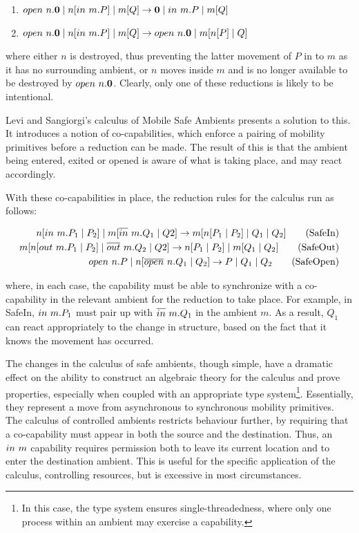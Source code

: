 \begin{enumerate}
\item $open\ n.\textbf{0} \;|\; n[in\ m.P] \;|\; m[Q] \rightarrow \textbf{0} \;|\;
in\ m.P \;|\; m[Q]$
\item $open\ n.\textbf{0} \;|\; n[in\ m.P] \;|\; m[Q] \rightarrow
open\ n.\textbf{0} \;|\; m[n[P] \;|\; Q]$
\end{enumerate}

\noindent where either $n$ is destroyed, thus preventing the latter
movement of $P$ in to $m$ as it has no surrounding ambient, or $n$ moves
inside $m$ and is no longer available to be destroyed by
$open\ n.\textbf{0}$.  Clearly, only one of these reductions is likely to be
intentional.  

Levi and Sangiorgi's calculus of Mobile Safe Ambients
\cite*{safeamb00,sangiorgi:mobsafeambients} presents a solution to
this.  It introduces a notion of co-capabilities, which enforce a
pairing of mobility primitives before a reduction can be made.  The
result of this is that the ambient being entered, exited or opened is
aware of what is taking place, and may react accordingly.

With these co-capabilities in place, the reduction rules for the
calculus run as follows:

\begin{align}
 n[in\ m.P_1 \;|\; P_2] \;|\; m[\overline{in}\ m.Q_1 \;|\; Q2]
\rightarrow
m[n[P_1 \;|\; P_2] \;|\; Q_1 \;|\; Q_2] \tag{SafeIn}\\
 m[n[out\ m.P_1 \;|\; P_2] \;|\; \overline{out}\ m.Q_2 \;|\; Q2]
\rightarrow
n[P_1 \;|\; P_2] \;|\; m[Q_1 \;|\; Q_2] \tag{SafeOut}\\
 open\ n.P \;|\; n[\overline{open}\ n.Q_1 \;|\; Q_2]
\rightarrow
P \;|\; Q_1 \;|\; Q_2 \tag{SafeOpen} 
\end{align}

\noindent where, in each case, the capability must be able to
synchronize with a co-capability in the relevant ambient for the
reduction to take place.  For example, in SafeIn, $in\ m.P_1$ must
pair up with $\overline{in}\ m.Q_1$ in the ambient $m$.  As a result, $Q_1$
can react appropriately to the change in structure, based on the fact
that it knows the movement has occurred.

The changes in the calculus of safe ambients, though simple, have a
dramatic effect on the ability to construct an algebraic theory for
the calculus and prove properties, especially when coupled with an
appropriate type system\footnote{In this case, the type system ensures
  single-threadedness, where only one process within an ambient may
  exercise a capability.}.  Essentially, they represent a move from
asynchronous to synchronous mobility primitives.  The calculus of
controlled ambients \cite*{controlledamb02} restricts behaviour
further, by requiring that a co-capability must appear in both the
source and the destination.  Thus, an $in\ m$ capability requires
permission both to leave its current location and to enter the
destination ambient. This is useful for the specific application of
the calculus, controlling resources, but is excessive in most
circumstances.


